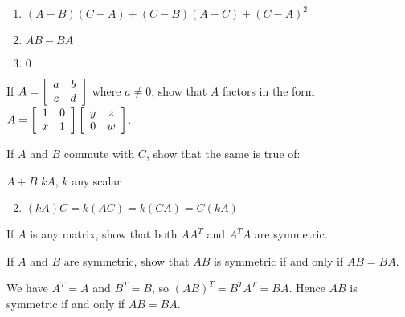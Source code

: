 \begin{multicols}{2}
\begin{ex}
\begin{enumerate}[label={\alph*.}]
\item $(A - B)(C - A) + (C - B)(A - C) + (C - A)^{2}$

\end{enumerate}
\begin{sol}
\begin{enumerate}[label={\alph*.}]
\setcounter{enumi}{1}
\item $AB - BA$

\setcounter{enumi}{3}
\item $0$
\end{enumerate}
\end{sol}
\end{ex}

\begin{ex}
If $A = \left[ \begin{array}{cc}
a & b \\
c & d
\end{array} \right]$
 where $a \neq 0$, show that $A$ factors in the form 
 $A = \left[ \begin{array}{cc}
 1 & 0 \\
 x & 1
 \end{array} \right] \left[ \begin{array}{cc}
 y & z \\
 0 & w
 \end{array} \right]$.
\end{ex}

\begin{ex}
If $A$ and $B$ commute with $C$, show that the same is true of:
\begin{exenumerate}
\exitem $A + B$
\exitem $kA$, $k$ any scalar
\end{exenumerate}
\begin{sol}
\begin{enumerate}[label={\alph*.}]
\setcounter{enumi}{1}
\item $(kA)C = k(AC) = k(CA) = C(kA)$

\end{enumerate}
\end{sol}
\end{ex}

\begin{ex}
If $A$ is any matrix, show that both $AA^{T}$ and $A^{T}A$ are symmetric.
\end{ex}

\begin{ex}
If $A$ and $B$ are symmetric, show that $AB$ is symmetric if and only if $AB = BA$.

\begin{sol}
We have $A^{T} = A$ and $B^{T} = B$, so $(AB)^{T} = B^{T}A^{T} = BA$. Hence $AB$ is symmetric if and only if $AB = BA$.
\end{sol}
\end{ex}


\end{multicols}
